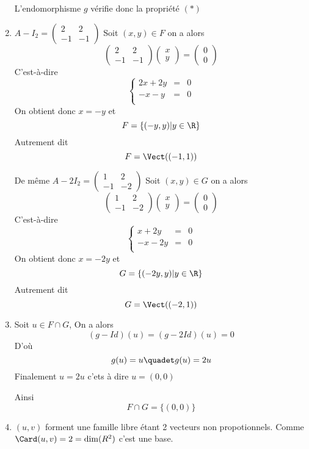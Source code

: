 \documentclass[a4paper, 11pt,reqno]{article}
\begin{document}
\begin{correction}
\begin{enumerate}
L'endomorphisme $g$  vérifie donc la propriété $(*)$
\item 
$A-I_2 = \begin{pmatrix}
2 & 2\\
-1 & -1
\end{pmatrix}$
Soit $(x,y) \in F$ on a alors 
$$\begin{pmatrix}
2 & 2\\
-1 & -1
\end{pmatrix} \begin{pmatrix}
x\\
y
\end{pmatrix}=\begin{pmatrix}
0\\
0
\end{pmatrix}$$
C'est-à-dire 
$$\left\{ 
\begin{array}{ccc}
2x+2y &=&0\\
-x-y &=&0\\
\end{array}
\right.$$
On obtient donc $x=-y$ et 
$$F= \{ (-y,y) | y\in \R\} $$
Autrement dit 
$$F =\Vect((-1,1))$$

De même
$A-2I_2 = \begin{pmatrix}
1 & 2\\
-1 & -2
\end{pmatrix}$
Soit $(x,y) \in G$ on a alors 
$$\begin{pmatrix}
1 & 2\\
-1 & -2
\end{pmatrix} \begin{pmatrix}
x\\
y
\end{pmatrix}=\begin{pmatrix}
0\\
0
\end{pmatrix}$$
C'est-à-dire 
$$\left\{ 
\begin{array}{ccc}
x+2y &=&0\\
-x-2y &=&0\\
\end{array}
\right.$$
On obtient donc $x=-2y$ et 
$$G= \{ (-2y,y) | y\in \R\} $$
Autrement dit 
$$G =\Vect((-2,1))$$

\item Soit $u \in F\cap G$, 
On a alors 
$$(g-Id)(u) = (g-2Id)(u) = 0$$
D'où
$$g(u)=u \quadet g(u)=2u$$
Finalement 
$u=2u$ c'ets à dire $u=(0,0)$

Ainsi 
$$F\cap G =\{ (0,0)\}$$

\item $(u,v)$ forment une famille libre étant 2 vecteurs non propotionnels. Comme $\Card(u,v) =2 =\dim(R^2)$ c'est une base. 


\end{enumerate}
\end{correction}
\end{document}
